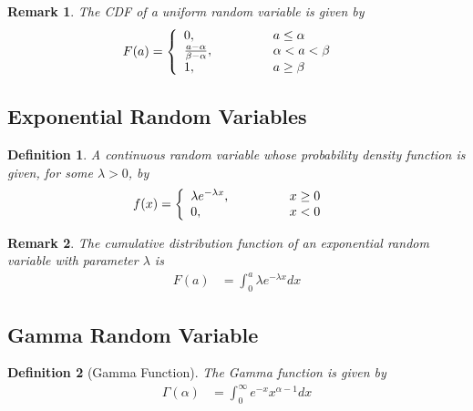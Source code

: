\documentclass[11pt, oneside]{book}   	%
\newtheorem{definition}{Definition}[chapter]
\newtheorem{remark}{Remark}[chapter]
\begin{document}
\begin{spacing}{1.618}
\begin{remark}
	The CDF of a uniform random variable is given by 
	\begin{alignat}{4}
		F(a)&=\left\{\begin{array}{lll}
			0,&\hspace{1 cm}&a\leq \alpha \\
			\frac{a - \alpha}{\beta - \alpha},&\hspace{1 cm}& \alpha<a<\beta \\
			1,&\hspace{1 cm}& a \geq \beta 
		\end{array}\right.
	\end{alignat}
\end{remark}

\subsection{Exponential Random Variables}

\begin{definition}
	A continuous random variable whose probability density function is given, for some $\lambda > 0$, by 
	\begin{alignat}{4}
		f(x)&=\left\{\begin{array}{lll}
			\lambda e^{-\lambda x},&\hspace{1 cm}&x\geq 0 \\
			0,&\hspace{1 cm}&x< 0
		\end{array}\right.
	\end{alignat}
\end{definition}

\begin{remark}
	The cumulative distribution function of an exponential random variable with parameter $\lambda$ is 
	\begin{alignat}{4}
		F(a)&=\int_0^a\lambda e^{-\lambda x} dx
	\end{alignat}
\end{remark}

\subsection{Gamma Random Variable}

\begin{definition}[Gamma Function]
	The Gamma function is given by 
	\begin{alignat}{4}
		\Gamma(\alpha)&=\int_0^\infty e^{-x}x^{\alpha - 1} dx
	\end{alignat}
\end{definition}


\end{spacing}
\end{document}
